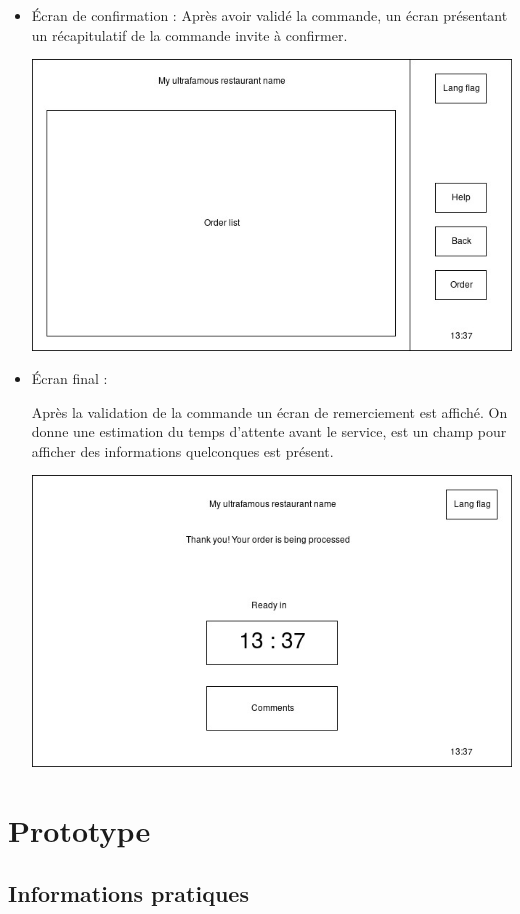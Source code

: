 \documentclass[a4paper,12pt]{article}
\begin{document}
\begin{itemize}
\item Écran de confirmation :
Après avoir validé la commande, un écran présentant un récapitulatif de la commande invite à confirmer.

\includegraphics[width=13cm]{confirmation_screen.jpg}

\item Écran final :

Après la validation de la commande un écran de remerciement est affiché. On donne une estimation du temps d'attente
avant le service, est un champ pour afficher des informations quelconques est présent.

\includegraphics[width=13cm]{final_screen.jpg}

\end{itemize}

\section{Prototype}

\subsection{Informations pratiques}
\end{document}
